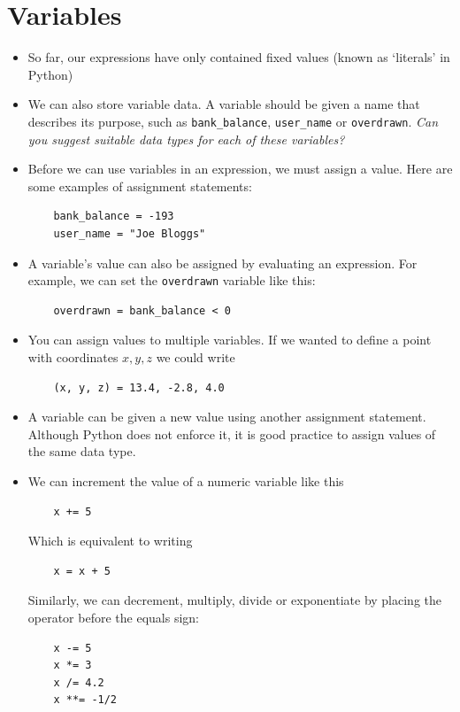 \documentclass[a4paper,twoside,titlepage]{memoir}
\newcommand{\shellcmd}{\texttt}
\begin{document}
\section{Variables}
\begin{itemize}
	\item So far, our expressions have only contained fixed values (known as `literals' in Python)
	\item We can also store variable data.  A variable should be given a name that describes its purpose, such as \shellcmd{bank\_balance}, \shellcmd{user\_name} or \shellcmd{overdrawn}.  \textit{Can you suggest suitable data types for each of these variables?}
	\item Before we can use variables in an expression, we must assign a value.  Here are some examples of assignment statements:
\begin{verbatim}
	bank_balance = -193
	user_name = "Joe Bloggs"
\end{verbatim}
	\item A variable's value can also be assigned by evaluating an expression.  For example, we can set the \shellcmd{overdrawn} variable like this:
\begin{verbatim}
	overdrawn = bank_balance < 0
\end{verbatim}
	\item You can assign values to multiple variables.  If we wanted to define a point with coordinates $x, y, z$ we could write
\begin{verbatim}
	(x, y, z) = 13.4, -2.8, 4.0
\end{verbatim}
	\item A variable can be given a new value using another assignment statement.  Although Python does not enforce it, it is good practice to assign values of the same data type.
	\item We can increment the value of a numeric variable like this
\begin{verbatim}
	x += 5
\end{verbatim}
Which is equivalent to writing
\begin{verbatim}
	x = x + 5
\end{verbatim}
Similarly, we can decrement, multiply, divide or exponentiate by placing the operator before the equals sign:
\begin{verbatim}
	x -= 5
	x *= 3
	x /= 4.2
	x **= -1/2
\end{verbatim}
\end{itemize}
\end{document}
